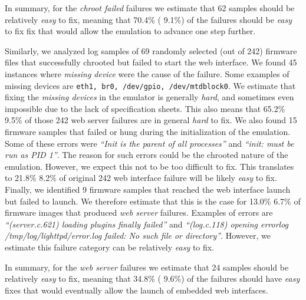 \documentclass[conference]{./templates/ndss/IEEEtran}
\newcounter{t0d0_counter}
\newcounter{pr00f_counter}
\newcommand{\CountFirmwareEmulatedWebServerNOTStarted}{242}
\newcommand{\EmulatedNOTOKRandSamplFixEASY}{62}
\newcommand{\EmulatedNOTOKRandSamplFixEASYPct}{70.4\%}
\newcommand{\EmulatedNOTOKRandSamplFixEASYConfInt}{9.1\%}
\newcommand{\WebServerNOTOKRandSampl}{69}
\newcommand{\WebServerNOTOKRandSamplDeviceFail}{45}
\newcommand{\WebServerNOTOKRandSamplDeviceFailPct}{65.2\%}
\newcommand{\WebServerNOTOKRandSamplDeviceFailConfInt}{9.5\%}
\newcommand{\WebServerNOTOKRandSamplInitFail}{15}
\newcommand{\WebServerNOTOKRandSamplInitFailPct}{21.8\%}
\newcommand{\WebServerNOTOKRandSamplInitFailConfInt}{8.2\%}
\newcommand{\WebServerNOTOKRandSamplWebservFail}{9}
\newcommand{\WebServerNOTOKRandSamplWebservFailPct}{13.0\%}
\newcommand{\WebServerNOTOKRandSamplWebservFailConfInt}{6.7\%}
\newcommand{\WebServerNOTOKRandSamplFixEASY}{24}
\newcommand{\WebServerNOTOKRandSamplFixEASYPct}{34.8\%}
\newcommand{\WebServerNOTOKRandSamplFixEASYConfInt}{9.6\%}
\begin{document}
    In summary, for the \emph{chroot failed} failures we estimate that 
\EmulatedNOTOKRandSamplFixEASY{} samples should be relatively \emph{easy} to fix, 
meaning that \EmulatedNOTOKRandSamplFixEASYPct{} 
( \EmulatedNOTOKRandSamplFixEASYConfInt{}) of the failures should be \emph{easy} to fix  fix
that would allow the emulation to advance one step further. 

Similarly, we analyzed log samples of \WebServerNOTOKRandSampl{} randomly selected 
(out of \CountFirmwareEmulatedWebServerNOTStarted{}) firmware files that 
successfully chrooted but failed to start the web interface. 
    We found \WebServerNOTOKRandSamplDeviceFail{} instances where \emph{missing device} 
were the cause of the failure. Some examples of missing devices are 
\texttt{eth1, br0, /dev/gpio, /dev/mtdblock0}. We estimate that fixing 
the \emph{missing devices} in the emulator is generally \emph{hard}, and 
sometimes even impossible due to the lack of specification sheets. 
This also means that \WebServerNOTOKRandSamplDeviceFailPct{}  
\WebServerNOTOKRandSamplDeviceFailConfInt{} of those 
\CountFirmwareEmulatedWebServerNOTStarted{} web server failures are 
in general \emph{hard} to fix. 
    We also found \WebServerNOTOKRandSamplInitFail{} firmware samples 
that failed or hung during the initialization of the emulation. 
Some of these errors were \emph{``Init is the parent of all processes''} 
and \emph{``init: must be run as PID 1''}. The reason for such errors 
could be the chrooted nature of the emulation. However, we expect 
this not to be too difficult to fix. This translates to \WebServerNOTOKRandSamplInitFailPct{} 
 \WebServerNOTOKRandSamplInitFailConfInt{} of original 
\CountFirmwareEmulatedWebServerNOTStarted{} web interface failure 
will be likely \emph{easy} to fix. 
    Finally, we identified \WebServerNOTOKRandSamplWebservFail{} firmware 
samples that reached the web interface launch but failed to launch. 
We therefore estimate that this is the case for \WebServerNOTOKRandSamplWebservFailPct{}  
\WebServerNOTOKRandSamplWebservFailConfInt{} of firmware images that 
produced \emph{web server} failures. Examples of errors are 
\emph{``(server.c.621) loading plugins finally failed''} 
and \emph{``(log.c.118) opening errorlog /tmp/log/lighttpd/error.log failed: No such file or directory''}. 
However, we estimate this failure category can be relatively \emph{easy} to fix. 

    In summary, for the \emph{web server} failures we estimate that 
\WebServerNOTOKRandSamplFixEASY{} samples should be relatively \emph{easy} to fix, 
meaning that \WebServerNOTOKRandSamplFixEASYPct{} 
( \WebServerNOTOKRandSamplFixEASYConfInt{}) of the failures should have \emph{easy} 
fixes that would eventually allow the launch of embedded web interfaces. 
\end{document}

